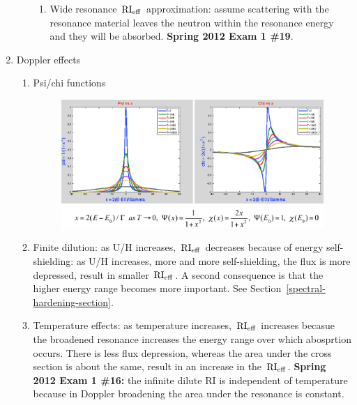 \documentclass{school-22.211-notes}
\begin{document}
\begin{enumerate}
\begin{enumerate}
\begin{enumerate}
      \item Wide resonance $\left. \mathrm{RI}_{\mathrm{eff}} \right.$ approximation: assume scattering with the resonance material leaves the neutron within the resonance energy and they will be absorbed. \textbf{Spring 2012 Exam 1 \#19}.
      \end{enumerate}
  \end{enumerate}

\item Doppler effects
  \begin{enumerate}
    \item Psi/chi functions

      \begin{figure}[ht]
        \centering
        \includegraphics[width=6in]{images/r-m/psi-chi-plot.png}
      \end{figure}

    \item Finite dilution: as U/H increases, $\left. \mathrm{RI}_{\mathrm{eff}} \right.$ decreases because of energy self-shielding: as U/H increases, more and more self-shielding, the flux is more depressed, result in smaller $\left. \mathrm{RI}_{\mathrm{eff}} \right.$. A second consequence is that the higher energy range becomes more important. See Section~\ref{spectral-hardening-section}. 
    \item Temperature effects: as temperature increases, $\left. \mathrm{RI}_{\mathrm{eff}} \right.$ increases becasue the broadened resonance increases the energy range over which abosprtion occurs. There is less flux depression, whereas the area under the cross section is about the same, result in an increase in the $\left. \mathrm{RI}_{\mathrm{eff}} \right.$. \textbf{Spring 2012 Exam 1 \#16:} the infinite dilute RI is independent of temperature because in Doppler broadening the area under the resonance is constant. 
  \end{enumerate}


\end{enumerate}
\end{document}
